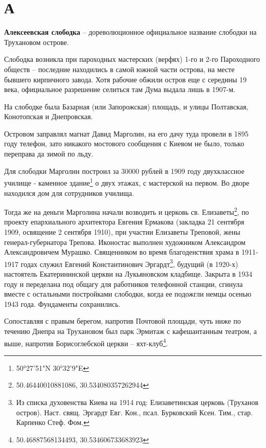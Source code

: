 \chapter*{А}

\textbf{Алексеевская слободка} –  дореволюционное официальное название слободки на Трухановом острове.

Слободка возникла при пароходных мастерских (верфях) 1-го и 2-го Пароходного обществ – последние находились в самой южной части острова, на месте бывшего кирпичного завода. Хотя рабочие обжили остров еще с середины 19 века, официальное разрешение селиться там Дума выдала лишь в 1907-м. 

На слободке была Базарная (или Запорожская) площадь, и улицы Полтавская, Конотопская и Днепровская.

Островом заправлял магнат Давид Марголин, на его дачу туда провели в 1895 году телефон, зато никакого мостового сообщения с Киевом не было, только переправа да зимой по льду.

Для слободки Марголин построил за 30000 рублей в 1909 году двухклассное училище - каменное здание\footnote{50°27'51"N 30°32'9"E} о двух этажах, с мастерской на первом. Во дворе находился дом для сотрудников училища.

Тогда же на деньги Марголина начали возводить и церковь св. Елизаветы\footnote{50.46440010881086, 30.534080357262944}, по проекту епархиального архитектора Евгения Ермакова (закладка 21 сентября 1909, освящение 2 сентября 1910), при участии Елизаветы Треповой, жены генерал-губернатора Трепова. Иконостас выполнен художником Александром Александровичем Мурашко. Священником во время благоденствия храма в 1911-1917 годах служил Евгений Константинович Эргардт\footnote{Из списка духовенства Киева на 1914 год: Елизаветинская церковь (Труханов остров). Наст. свящ. Эргардт Евг. Кон., псал. Бурковский Ксен. Тим., стар. Карпенко Стеф. Фом.}, будущий (в 1920-х) настоятель Екатерининской церкви на Лукьяновском кладбище. Закрыта в 1934 году и переделана под общагу для работников телефонной станции, сгинула вместе с остальными постройками слободки, когда ее подожгли немцы осенью 1943 года. Фундаменты сохранились.

Сопоставляя с правым берегом, напротив Почтовой площади, чуть ниже по течению Днепра на Трухановом был парк Эрмитаж с кафешантанным театром, а выше, напротив Борисоглебской церкви – яхт-клуб\footnote{50.46887568134493, 30.534606733683923}.\\

